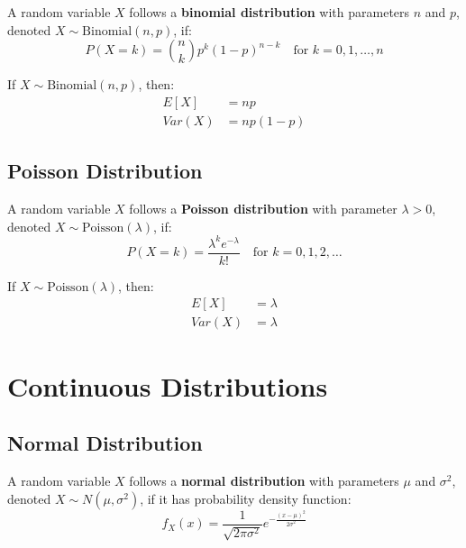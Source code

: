 \begin{definition}
A random variable $X$ follows a \textbf{binomial distribution} with parameters $n$ and $p$, denoted $X \sim \text{Binomial}(n, p)$, if:
\[P(X = k) = \binom{n}{k} p^k (1-p)^{n-k} \quad \text{for } k = 0, 1, \ldots, n\]
\end{definition}

\begin{theorem}
If $X \sim \text{Binomial}(n, p)$, then:
\begin{align}
E[X] &= np \\
Var(X) &= np(1-p)
\end{align}
\end{theorem}

\subsection{Poisson Distribution}

\begin{definition}
A random variable $X$ follows a \textbf{Poisson distribution} with parameter $\lambda > 0$, denoted $X \sim \text{Poisson}(\lambda)$, if:
\[P(X = k) = \frac{\lambda^k e^{-\lambda}}{k!} \quad \text{for } k = 0, 1, 2, \ldots\]
\end{definition}

\begin{theorem}
If $X \sim \text{Poisson}(\lambda)$, then:
\begin{align}
E[X] &= \lambda \\
Var(X) &= \lambda
\end{align}
\end{theorem}

\section{Continuous Distributions}

\subsection{Normal Distribution}

\begin{definition}
A random variable $X$ follows a \textbf{normal distribution} with parameters $\mu$ and $\sigma^2$, denoted $X \sim N(\mu, \sigma^2)$, if it has probability density function:
\[f_X(x) = \frac{1}{\sqrt{2\pi\sigma^2}} e^{-\frac{(x-\mu)^2}{2\sigma^2}}\]
\end{definition}

